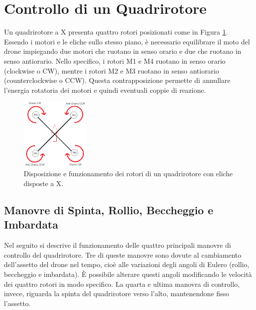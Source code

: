 
\section{Controllo di un Quadrirotore}
Un quadrirotore a X presenta quattro rotori posizionati come in Figura \ref{fig:quadRotors}. Essendo i motori e le eliche sullo stesso piano, è necessario equilibrare il moto del drone impiegando due motori che ruotano in senso orario e due che ruotano in senso antiorario. Nello specifico, i rotori M1 e M4 ruotano in senso orario (clockwise o CW), mentre i rotori M2 e M3 ruotano in senso antiorario (counterclockwise o CCW). Questa contrapposizione permette di annullare l'energia rotatoria dei motori e quindi eventuali coppie di reazione.

\begin{figure}[H]
    \centering
    \includegraphics[width=0.3\textwidth]{gfx/rotori_quadrotor}
    \caption[Funzionamento dei rotori di un quadrirotore a X.]{Disposizione e funzionamento dei rotori di un quadrirotore con eliche disposte a X.}
    \label{fig:quadRotors}
\end{figure}

\subsection{Manovre di Spinta, Rollio, Beccheggio e Imbardata}

Nel seguito si descrive il funzionamento delle quattro principali manovre di controllo del quadrirotore. Tre di queste manovre sono dovute al cambiamento dell'assetto del drone nel tempo, cioè alle variazioni degli angoli di Eulero (rollio, beccheggio e imbardata). È possibile alterare questi angoli modificando le velocità dei quattro rotori in modo specifico. La quarta e ultima manovra di controllo, invece, riguarda la spinta del quadrirotore verso l'alto, mantenendone fisso l'assetto.

